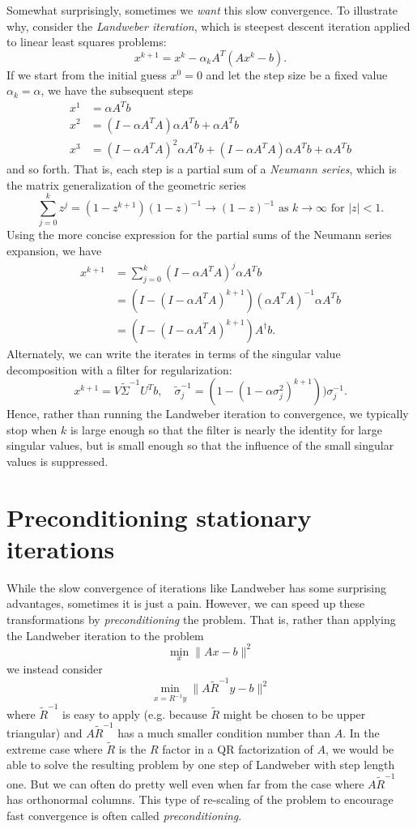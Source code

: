 \documentclass[12pt, leqno]{article} %
\begin{document}
Somewhat surprisingly, sometimes we {\em want} this slow convergence.
To illustrate why, consider the {\em Landweber iteration}, which
is steepest descent iteration applied to linear least squares
problems:
\[
  x^{k+1} = x^k - \alpha_k A^T (Ax^k-b).
\] 
If we start from the initial guess $x^0 = 0$ and let the step size
be a fixed value $\alpha_k = \alpha$, we have the subsequent steps
\begin{align*}
  x^1 &= \alpha A^T b \\
  x^2 &= (I-\alpha A^T A) \alpha A^T b + \alpha A^T b \\
  x^3 &= (I-\alpha A^T A)^2 \alpha A^T b +
         (I-\alpha A^T A) \alpha A^T b +
         \alpha A^T b
\end{align*}
and so forth.
That is, each step is a partial sum of a {\em Neumann series},
which is the matrix generalization of the geometric series
\[
  \sum_{j=0}^k z^j = (1-z^{k+1})(1-z)^{-1} \rightarrow (1-z)^{-1}
  \mbox{ as } k \rightarrow \infty \mbox{ for } |z| < 1.
\]
Using the more concise expression for the partial sums of the
Neumann series expansion, we have
\begin{align*}
  x^{k+1}
  &= \sum_{j=0}^k (I-\alpha A^TA)^j \alpha A^T b \\
  &= (I-(I-\alpha A^TA)^{k+1}) (\alpha A^TA)^{-1} \alpha A^T b \\
  &= (I-(I-\alpha A^TA)^{k+1}) A^\dagger b.
\end{align*}
Alternately, we can write the iterates in terms of the singular value
decomposition with a filter for regularization:
\[
x^{k+1} = V \tilde{\Sigma}^{-1} U^T b, \quad
\tilde{\sigma}_j^{-1} = (1-(1-\alpha \sigma_j^2)^{k+1})) \sigma_j^{-1}.
\]
Hence, rather than running the Landweber iteration to convergence,
we typically stop when $k$ is large enough so that the filter is
nearly the identity for large singular values, but is small enough
so that the influence of the small singular values is suppressed.

\section{Preconditioning stationary iterations}

While the slow convergence of iterations like Landweber has some
surprising advantages, sometimes it is just a pain.  However, we can
speed up these transformations by {\em preconditioning} the problem.
That is, rather than applying the Landweber iteration to the problem
\[
  \min_{x} \|Ax-b\|^2
\]
we instead consider
\[
  \min_{x = R^{-1} y} \|A \tilde{R}^{-1} y - b\|^2
\]
where $\tilde{R}^{-1}$ is easy to apply (e.g. because $\tilde{R}$
might be chosen to be upper triangular) and $A \tilde{R}^{-1}$ has a
much smaller condition number than $A$.  In the extreme case where
$\tilde{R}$ is the $R$ factor in a QR factorization of $A$, we would
be able to solve the resulting problem by one step of Landweber with
step length one.  But we can often do pretty well even when far from
the case where $A \tilde{R}^{-1}$ has orthonormal columns.  This type
of re-scaling of the problem to encourage fast convergence is often
called {\em preconditioning}.
\end{document}
